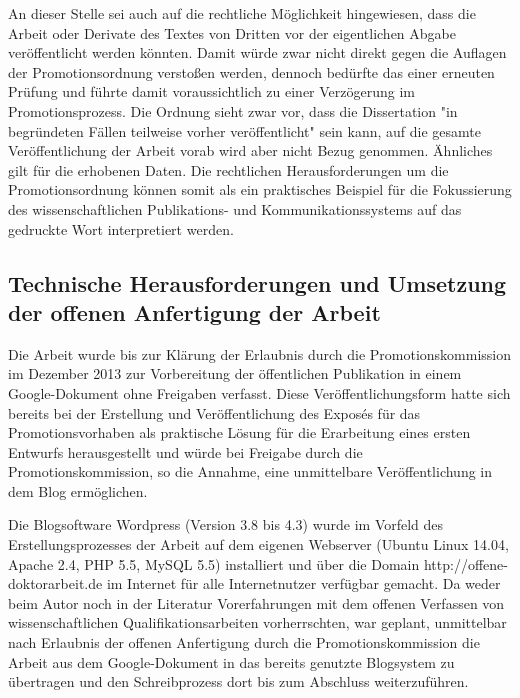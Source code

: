 An dieser Stelle sei auch auf die rechtliche Möglichkeit hingewiesen, dass die Arbeit oder Derivate des Textes von Dritten vor der eigentlichen Abgabe veröffentlicht werden könnten. Damit würde zwar nicht direkt gegen die Auflagen der Promotionsordnung verstoßen werden, dennoch bedürfte das einer erneuten Prüfung und führte damit voraussichtlich zu einer Verzögerung im Promotionsprozess. Die Ordnung sieht zwar vor, dass die Dissertation "in begründeten Fällen teilweise vorher veröffentlicht" \cite{Leuphana_2011} sein kann, auf die gesamte Veröffentlichung der Arbeit vorab wird aber nicht Bezug genommen. Ähnliches gilt für die erhobenen Daten. Die rechtlichen Herausforderungen um die Promotionsordnung können somit als ein praktisches Beispiel für die Fokussierung des wissenschaftlichen Publikations- und Kommunikationssystems auf das gedruckte Wort interpretiert werden.

\subsection{Technische Herausforderungen und Umsetzung der offenen Anfertigung der Arbeit}

Die Arbeit wurde bis zur Klärung der Erlaubnis durch die Promotionskommission im Dezember 2013 zur Vorbereitung der öffentlichen Publikation in einem Google-Dokument ohne Freigaben verfasst. Diese Veröffentlichungsform hatte sich bereits bei der Erstellung und Veröffentlichung des Exposés für das Promotionsvorhaben \cite{Heise_2012a} als praktische Lösung für die Erarbeitung eines ersten Entwurfs herausgestellt und würde bei Freigabe durch die Promotionskommission, so die Annahme, eine unmittelbare Veröffentlichung in dem Blog ermöglichen.

Die Blogsoftware Wordpress (Version 3.8 bis 4.3) wurde im Vorfeld des Erstellungsprozesses der Arbeit auf dem eigenen Webserver (Ubuntu Linux 14.04, Apache 2.4, PHP 5.5, MySQL 5.5) installiert und über die Domain http://offene-doktorarbeit.de im Internet für alle Internetnutzer verfügbar gemacht. Da weder beim Autor noch in der Literatur Vorerfahrungen mit dem offenen Verfassen von wissenschaftlichen Qualifikationsarbeiten vorherrschten, war geplant, unmittelbar nach Erlaubnis der offenen Anfertigung durch die Promotionskommission die Arbeit aus dem Google-Dokument in das bereits genutzte Blogsystem zu übertragen und den Schreibprozess dort bis zum Abschluss weiterzuführen.

